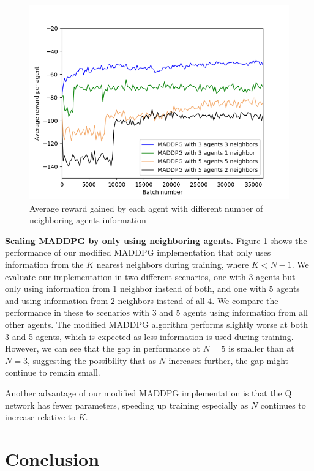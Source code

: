 \documentclass{article}
\begin{document}
\begin{figure}
\begin{center}
\includegraphics[scale=0.5]{MADDPG_different_neighbors.png}
\end{center}
\caption{Average reward gained by each agent with different number of neighboring agents information}
\label{fig:avg_reward_different_neighbors}
\end{figure}


\textbf{Scaling MADDPG by only using neighboring agents.} Figure \ref{fig:avg_reward_different_neighbors} shows the performance of our modified MADDPG implementation that only uses information from the $K$ nearest neighbors during training, where $K < N-1$. We evaluate our implementation in two different scenarios, one with 3 agents but only using information from 1 neighbor instead of both, and one with 5 agents and using information from 2 neighbors instead of all 4. We compare the performance in these to scenarios with 3 and 5 agents using information from all other agents. The modified MADDPG algorithm performs slightly worse at both 3 and 5 agents, which is expected as less information is used during training. However, we can see that the gap in performance at $N=5$ is smaller than at $N=3$, suggesting the possibility that as $N$ increases further, the gap might continue to remain small.

Another advantage of our modified MADDPG implementation is that the Q network has fewer parameters, speeding up training especially as $N$ continues to increase relative to $K$.

\section{Conclusion}
\end{document}
